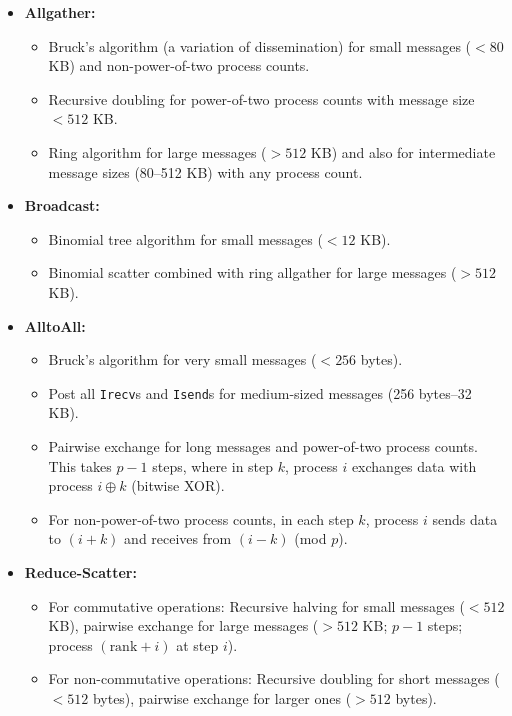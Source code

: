 \documentclass[12pt]{book}
\begin{document}
\begin{itemize}
    \item \textbf{Allgather:} 
    \begin{itemize}
        \item Bruck's algorithm (a variation of dissemination) for small messages ($<80$ KB) and non-power-of-two process counts.
        \item Recursive doubling for power-of-two process counts with message size $<512$ KB.
        \item Ring algorithm for large messages ($>512$ KB) and also for intermediate message sizes (80--512 KB) with any process count.
    \end{itemize}

    \item \textbf{Broadcast:} 
    \begin{itemize}
        \item Binomial tree algorithm for small messages ($<12$ KB).
        \item Binomial scatter combined with ring allgather for large messages ($>512$ KB).
    \end{itemize}

    \item \textbf{AlltoAll:} 
    \begin{itemize}
        \item Bruck's algorithm for very small messages ($<256$ bytes).
        \item Post all \texttt{Irecv}s and \texttt{Isend}s for medium-sized messages (256 bytes--32 KB).
        \item Pairwise exchange for long messages and power-of-two process counts. This takes $p-1$ steps, where in step $k$, process $i$ exchanges data with process $i \oplus k$ (bitwise XOR).
        \item For non-power-of-two process counts, in each step $k$, process $i$ sends data to $(i+k)$ and receives from $(i-k)$ (mod $p$).
    \end{itemize}

    \item \textbf{Reduce-Scatter:} 
    \begin{itemize}
        \item For commutative operations: Recursive halving for small messages ($<512$ KB), pairwise exchange for large messages ($>512$ KB; $p-1$ steps; process $(\text{rank}+i)$ at step $i$).
        \item For non-commutative operations: Recursive doubling for short messages ($<512$ bytes), pairwise exchange for larger ones ($>512$ bytes).
    \end{itemize}


\end{itemize}
\end{document}
